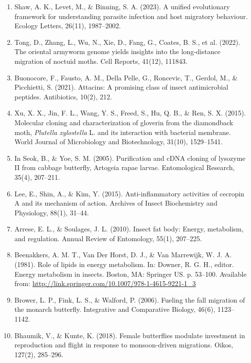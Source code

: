 \documentclass[lineno]{wiley-article}
\begin{document}
\begin{enumerate}
\item Shaw, A. K., Levet, M., \& Binning, S. A. (2023). A unified evolutionary framework for understanding parasite infection and host migratory behaviour. Ecology Letters, 26(11), 1987–2002.

\item Tong, D., Zhang, L., Wu, N., Xie, D., Fang, G., Coates, B. S., et al. (2022). The oriental armyworm genome yields insights into the long-distance migration of noctuid moths. Cell Reports, 41(12), 111843.

\item Buonocore, F., Fausto, A. M., Della Pelle, G., Roncevic, T., Gerdol, M., \& Picchietti, S. (2021). Attacins: A promising class of insect antimicrobial peptides. Antibiotics, 10(2), 212.

\item Xu, X. X., Jin, F. L., Wang, Y. S., Freed, S., Hu, Q. B., \& Ren, S. X. (2015). Molecular cloning and characterization of gloverin from the diamondback moth, \textit{Plutella xylostella} L. and its interaction with bacterial membrane. World Journal of Microbiology and Biotechnology, 31(10), 1529–1541.

\item In Seok, B., \& Yoe, S. M. (2005). Purification and cDNA cloning of lysozyme II from cabbage butterfly, Artogeia rapae larvae. Entomological Research, 35(4), 207–211.

\item Lee, E., Shin, A., \& Kim, Y. (2015). Anti-inflammatory activities of cecropin A and its mechanism of action. Archives of Insect Biochemistry and Physiology, 88(1), 31–44.

\item Arrese, E. L., \& Soulages, J. L. (2010). Insect fat body: Energy, metabolism, and regulation. Annual Review of Entomology, 55(1), 207–225.

\item Beenakkers, A. M. T., Van Der Horst, D. J., \& Van Marrewijk, W. J. A. (1981). Role of lipids in energy metabolism. In: Downer, R. G. H., editor. Energy metabolism in insects. Boston, MA: Springer US. p. 53–100. Available from: \url{http://link.springer.com/10.1007/978-1-4615-9221-1_3}

\item Brower, L. P., Fink, L. S., \& Walford, P. (2006). Fueling the fall migration of the monarch butterfly. Integrative and Comparative Biology, 46(6), 1123–1142.

\item Bhaumik, V., \& Kunte, K. (2018). Female butterflies modulate investment in reproduction and flight in response to monsoon-driven migrations. Oikos, 127(2), 285–296.


\end{enumerate}
\end{document}
